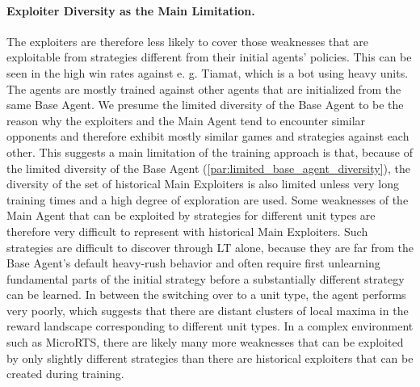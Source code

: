 \documentclass[10pt,twocolumn,letterpaper]{article}
\begin{document}
\paragraph{Exploiter Diversity as the Main Limitation.}
The exploiters are therefore less likely to cover those weaknesses that are exploitable from strategies different from their initial agents' policies.
This can be seen in the high win rates against e. g. Tiamat, which is a bot using heavy units.
The agents are mostly trained against other agents that are initialized from the same Base Agent.
We presume the limited diversity of the Base Agent to be the reason why the exploiters and the Main Agent tend to encounter similar opponents and therefore exhibit mostly similar games and strategies against each other.
This suggests a main limitation of the training approach is that, because of the limited diversity of the Base Agent (\ref{par:limited_base_agent_diversity}), the diversity of the set of historical Main Exploiters is also limited unless very long training times and a high degree of exploration are used.
Some weaknesses of the Main Agent that can be exploited by strategies for different unit types are therefore very difficult to represent with historical Main Exploiters.
Such strategies are difficult to discover through LT alone, because they are far from the Base Agent's default heavy-rush behavior and often require first unlearning fundamental parts of the initial strategy before a substantially different strategy can be learned.
In between the switching over to a unit type, the agent performs very poorly, which suggests that there are distant clusters of local maxima in the reward landscape corresponding to different unit types.
In a complex environment such as MicroRTS, there are likely many more weaknesses that can be exploited by only slightly different strategies than there are historical exploiters that can be created during training.
\end{document}
